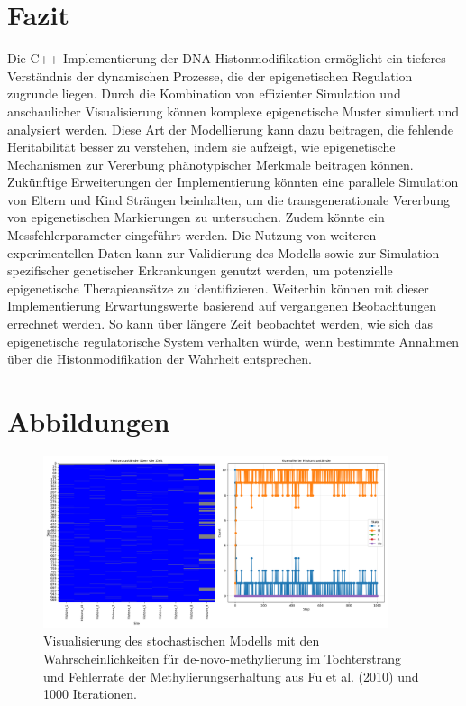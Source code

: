 \documentclass{SeminarV2}
\begin{document}
\section{Fazit}
Die C++ Implementierung der DNA-Histonmodifikation erm\"{o}glicht ein tieferes Verst\"{a}ndnis der dynamischen Prozesse, die der epigenetischen Regulation zugrunde liegen. Durch die Kombination von effizienter Simulation und anschaulicher Visualisierung k\"{o}nnen komplexe epigenetische Muster simuliert und analysiert werden.
Diese Art der Modellierung kann dazu beitragen, die fehlende Heritabilit\"{a}t besser zu verstehen, indem sie aufzeigt, wie epigenetische Mechanismen zur Vererbung ph\"{a}notypischer Merkmale beitragen k\"{o}nnen. 
Zuk\"{u}nftige Erweiterungen der Implementierung k\"{o}nnten eine parallele Simulation von Eltern und Kind Str\"{a}ngen beinhalten, um die transgenerationale Vererbung von epigenetischen Markierungen zu untersuchen.
Zudem könnte ein Messfehlerparameter eingeführt werden.
Die Nutzung von weiteren experimentellen Daten kann zur Validierung des Modells sowie zur Simulation spezifischer genetischer Erkrankungen genutzt werden, um potenzielle epigenetische Therapieans\"{a}tze zu identifizieren.
Weiterhin können mit dieser Implementierung Erwartungswerte basierend auf vergangenen Beobachtungen errechnet werden. So kann \"{u}ber l\"{a}ngere Zeit beobachtet werden, wie sich das epigenetische regulatorische System verhalten w\"{u}rde, wenn bestimmte Annahmen \"{u}ber die Histonmodifikation der Wahrheit entsprechen.
\newpage
\section{Abbildungen}


\begin{figure}[htbp]
  \centering
  \includegraphics[width=0.9\textwidth]{images/Histone_Fu_1000.png}
  \caption{Visualisierung des stochastischen Modells mit den Wahrscheinlichkeiten für de-novo-methylierung im Tochterstrang und Fehlerrate der Methylierungserhaltung aus Fu et al. (2010) und 1000 Iterationen. \cite{fu-2010}}
  \label{fig:Fu_1000}
\end{figure}
\end{document}
